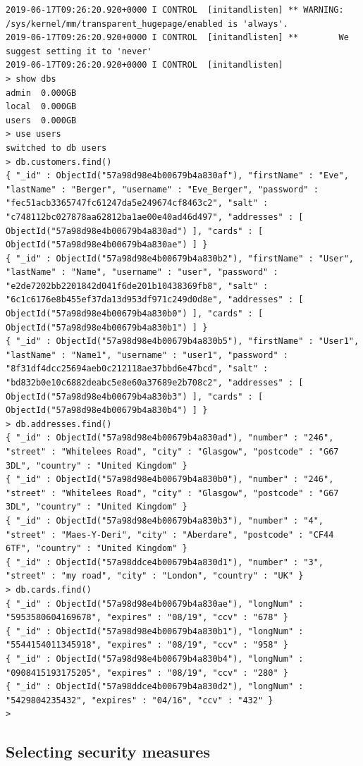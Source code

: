 \begin{lstlisting}
2019-06-17T09:26:20.920+0000 I CONTROL  [initandlisten] ** WARNING: /sys/kernel/mm/transparent_hugepage/enabled is 'always'.
2019-06-17T09:26:20.920+0000 I CONTROL  [initandlisten] **        We suggest setting it to 'never'
2019-06-17T09:26:20.920+0000 I CONTROL  [initandlisten]
> show dbs
admin  0.000GB
local  0.000GB
users  0.000GB
> use users
switched to db users
> db.customers.find()
{ "_id" : ObjectId("57a98d98e4b00679b4a830af"), "firstName" : "Eve", "lastName" : "Berger", "username" : "Eve_Berger", "password" : "fec51acb3365747fc61247da5e249674cf8463c2", "salt" : "c748112bc027878aa62812ba1ae00e40ad46d497", "addresses" : [ ObjectId("57a98d98e4b00679b4a830ad") ], "cards" : [ ObjectId("57a98d98e4b00679b4a830ae") ] }
{ "_id" : ObjectId("57a98d98e4b00679b4a830b2"), "firstName" : "User", "lastName" : "Name", "username" : "user", "password" : "e2de7202bb2201842d041f6de201b10438369fb8", "salt" : "6c1c6176e8b455ef37da13d953df971c249d0d8e", "addresses" : [ ObjectId("57a98d98e4b00679b4a830b0") ], "cards" : [ ObjectId("57a98d98e4b00679b4a830b1") ] }
{ "_id" : ObjectId("57a98d98e4b00679b4a830b5"), "firstName" : "User1", "lastName" : "Name1", "username" : "user1", "password" : "8f31df4dcc25694aeb0c212118ae37bbd6e47bcd", "salt" : "bd832b0e10c6882deabc5e8e60a37689e2b708c2", "addresses" : [ ObjectId("57a98d98e4b00679b4a830b3") ], "cards" : [ ObjectId("57a98d98e4b00679b4a830b4") ] }
> db.addresses.find()
{ "_id" : ObjectId("57a98d98e4b00679b4a830ad"), "number" : "246", "street" : "Whitelees Road", "city" : "Glasgow", "postcode" : "G67 3DL", "country" : "United Kingdom" }
{ "_id" : ObjectId("57a98d98e4b00679b4a830b0"), "number" : "246", "street" : "Whitelees Road", "city" : "Glasgow", "postcode" : "G67 3DL", "country" : "United Kingdom" }
{ "_id" : ObjectId("57a98d98e4b00679b4a830b3"), "number" : "4", "street" : "Maes-Y-Deri", "city" : "Aberdare", "postcode" : "CF44 6TF", "country" : "United Kingdom" }
{ "_id" : ObjectId("57a98ddce4b00679b4a830d1"), "number" : "3", "street" : "my road", "city" : "London", "country" : "UK" }
> db.cards.find()
{ "_id" : ObjectId("57a98d98e4b00679b4a830ae"), "longNum" : "5953580604169678", "expires" : "08/19", "ccv" : "678" }
{ "_id" : ObjectId("57a98d98e4b00679b4a830b1"), "longNum" : "5544154011345918", "expires" : "08/19", "ccv" : "958" }
{ "_id" : ObjectId("57a98d98e4b00679b4a830b4"), "longNum" : "0908415193175205", "expires" : "08/19", "ccv" : "280" }
{ "_id" : ObjectId("57a98ddce4b00679b4a830d2"), "longNum" : "5429804235432", "expires" : "04/16", "ccv" : "432" }
>
\end{lstlisting}
\fi
\subsection{Selecting security measures}

